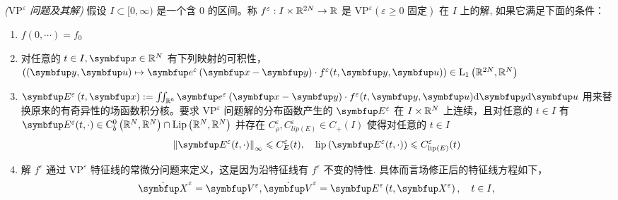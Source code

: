 \begin{definition}\textit{($\text{VP}^\varepsilon$ 问题及其解)}
    假设 $I \subset[0, \infty)$ 是一个含 $0$ 的区间。称 $f^{\varepsilon}: I \times {\mathbb{R}}^{2 N} \rightarrow {\mathbb{R}}$ 是 $\text{VP}^{\varepsilon}(\varepsilon \geqslant 0 \text { 固定})$ 在 $I$ 上的解, 如果它满足下面的条件：

    \begin{enumerate}[(1)] 
        \item $f(0,\cdots) = f_0$
        \item 对任意的 $t \in I, \vx \in \bbR^{N}$ 有下列映射的可积性， $\left((\vect{y},\vect{u}) \mapsto \vect{e}^{\varepsilon}\left(\vx-\vect{y}\right) \cdot f^{\varepsilon}(t, \vect{y},\vect{u})\right) \in \mathrm{L}_{1}\left(\bbR^{2 N}, \bbR^{N}\right)$ 
        \item $\vE^{\varepsilon}\left(t, \vx\right):=\iint_{\bbR^6}  \vect{e}^{\varepsilon}\left(\vx-\vect{y}\right) \cdot f^{\varepsilon}(t, \vect{y},\vect{u}) \mathrm{d} \vect{y} \mathrm{d}\vect{u}$ 用来替换原来的有奇异性的场函数积分核。要求 $\text{VP}^\varepsilon$ 问题解的分布函数产生的 $\vE^{\varepsilon}$ 在 $I \times {\mathbb{R}}^{N}$ 上连续，且对任意的 $t \in I$ 有 $\vE^{\varepsilon}(t, \cdot) \in \mathrm{C}_{b}^{0}\left(\bbR^{N}, \bbR^{N}\right) \cap \operatorname{Lip}\left(\bbR^{N}, \bbR^{N}\right)$ 并存在
        $C_\rho^{\varepsilon}, C_{lip(E)}^{\varepsilon} \in C_{+}(I)$ 使得对任意的 $t \in I$
        \[
        \left\|\vE^{\varepsilon}(t, \cdot)\right\|_{\infty} \leqslant C_{ E}^{\varepsilon}(t), \quad 
        \operatorname{lip}\left(\vE^{\varepsilon}(t, \cdot)\right) \leqslant C_{\operatorname{lip}(E)}^{\varepsilon}(t)
        \]
        \item 
        解 $f^{\varepsilon}$ 通过 $\text{VP}^\varepsilon$ 特征线的常微分问题来定义，这是因为沿特征线有 $f^\varepsilon$ 不变的特性. 具体而言场修正后的特征线方程如下， 
        \begin{equation}
            \dot{\vect{X}}^\varepsilon=\vect{V}^\varepsilon, \dot{\vect{V}}^\varepsilon=\vE^{\varepsilon}\left(t, \vect{X}^\varepsilon\right), \quad t \in I,
        \end{equation}
        

\end{enumerate}
\end{definition}
